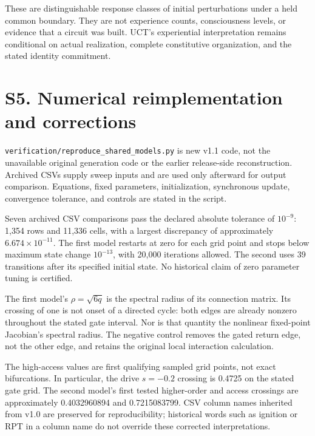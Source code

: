 \documentclass[
  11pt,
  a4paper,
]{article}
\begin{document}
These are distinguishable response classes of initial perturbations
under a held common boundary. They are not experience counts,
consciousness levels, or evidence that a circuit was built. UCT's
experiential interpretation remains conditional on actual realization,
complete constitutive organization, and the stated identity commitment.

\hypertarget{s5.-numerical-reimplementation-and-corrections}{%
\section{S5. Numerical reimplementation and
corrections}\label{s5.-numerical-reimplementation-and-corrections}}

\texttt{verification/reproduce\_shared\_models.py} is new v1.1 code, not
the unavailable original generation code or the earlier release-side
reconstruction. Archived CSVs supply sweep inputs and are used only
afterward for output comparison. Equations, fixed parameters,
initialization, synchronous update, convergence tolerance, and controls
are stated in the script.

Seven archived CSV comparisons pass the declared absolute tolerance of
\(10^{-9}\): 1,354 rows and 11,336 cells, with a largest discrepancy of
approximately \(6.674\times10^{-11}\). The first model restarts at zero
for each grid point and stops below maximum state change \(10^{-13}\),
with 20,000 iterations allowed. The second uses 39 transitions after its
specified initial state. No historical claim of zero parameter tuning is
certified.

The first model's \(\rho=\sqrt{6q}\) is the spectral radius of its
connection matrix. Its crossing of one is not onset of a directed cycle:
both edges are already nonzero throughout the stated gate interval. Nor
is that quantity the nonlinear fixed-point Jacobian's spectral radius.
The negative control removes the gated return edge, not the other edge,
and retains the original local interaction calculation.

The high-access values are first qualifying sampled grid points, not
exact bifurcations. In particular, the drive \(s=-0.2\) crossing is
0.4725 on the stated gate grid. The second model's first tested
higher-order and access crossings are approximately 0.4032960894 and
0.7215083799. CSV column names inherited from v1.0 are preserved for
reproducibility; historical words such as ignition or RPT in a column
name do not override these corrected interpretations.
\end{document}
